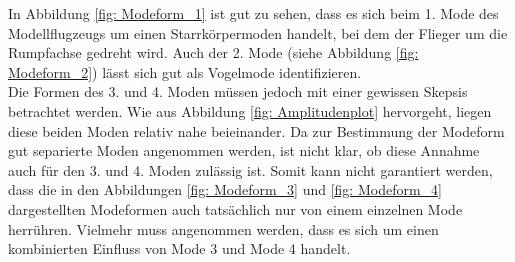    \noindent
    In Abbildung \ref{fig: Modeform_1} ist gut zu sehen, dass es sich beim 1.
    Mode des Modellflugzeugs um einen Starrkörpermoden handelt, bei dem der
    Flieger um die Rumpfachse gedreht wird. Auch der 2. Mode
    (siehe Abbildung \ref{fig: Modeform_2}) lässt sich gut als
    \glqq Vogelmode\grqq \hspace{0.05cm} identifizieren.
    \\
    
    \noindent
    Die Formen des 3. und 4. Moden müssen jedoch mit einer gewissen Skepsis
    betrachtet werden. Wie aus Abbildung \ref{fig: Amplitudenplot} hervorgeht,
    liegen diese beiden Moden relativ nahe beieinander. Da zur Bestimmung der
    Modeform gut separierte Moden angenommen werden, ist nicht klar, ob diese
    Annahme auch für den 3. und 4. Moden zulässig ist. Somit kann nicht garantiert
    werden, dass die in den Abbildungen \ref{fig: Modeform_3} und
    \ref{fig: Modeform_4} dargestellten Modeformen auch tatsächlich nur von einem
    einzelnen Mode herrühren. Vielmehr muss angenommen werden, dass es sich um
    einen kombinierten Einfluss von Mode 3 und Mode 4 handelt.